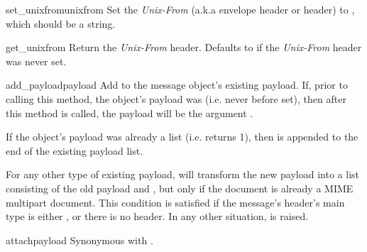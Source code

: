 \begin{methoddesc}[Message]{set_unixfrom}{unixfrom}
Set the \emph{Unix-From} (a.k.a envelope header or 
header) to , which should be a string.
\end{methoddesc}

\begin{methoddesc}[Message]{get_unixfrom}{}
Return the \emph{Unix-From} header.  Defaults to  if the
\emph{Unix-From} header was never set.
\end{methoddesc}

\begin{methoddesc}[Message]{add_payload}{payload}
Add  to the message object's existing payload.  If, prior
to calling this method, the object's payload was 
(i.e. never before set), then after this method is called, the payload
will be the argument .

If the object's payload was already a list
(i.e.  returns 1), then  is
appended to the end of the existing payload list.

For any other type of existing payload,  will
transform the new payload into a list consisting of the old payload
and , but only if the document is already a MIME
multipart document.  This condition is satisfied if the message's
 header's main type is either
, or there is no 
header.  In any other situation,
 is raised.
\end{methoddesc}

\begin{methoddesc}[Message]{attach}{payload}
Synonymous with .
\end{methoddesc}

